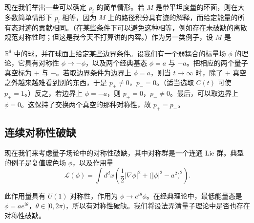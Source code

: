 
现在我们举出一些可以确定 $p_i$ 的简单情形。若 $M$ 是带平坦度量的环面，则在大多数简单情形下 $p_i$ 相等，因为 $M$ 上的路径积分具有迹的解释，而给定能量的所有态对迹的贡献相同。（在某些条件下可以避免这种相等，例如存在未破缺的离散规范对称性时；但这是我今天不打算讲的内容。）作为另一类例子，设 $M$ 是

$\mathbb{R}^d$ 中的球，并在球面上给定某些边界条件。设我们有一个弱耦合的标量场 $\phi$ 的理论，它具有对称性 $\phi\to-\phi$，以及两个经典基态 $\phi=a$ 与 $-a$。把相应的两个量子真空标为 $+$ 与 $-$。若取边界条件为边界上 $\phi=a$，则当 $t\to\infty$ 时，除了 $+$ 真空之外越来越难看到别的东西，于是 $p_+\neq0$，$p_-=0$。（适当选取 $C(t)$ 可使 $p_+=1$。）反之，若边界上 $\phi=-a$，则 $p_+=0$，$p_-\neq0$。最后，可以取边界上 $\phi=0$。这保持了交换两个真空的那种对称性，故 $p_+=p_-$。

\subsection{连续对称性破缺}

现在我们来考虑量子场论中的对称性破缺，其中对称群是一个连通 Lie 群。典型的例子是复值玻色场 $\phi$，以及作用量
\begin{equation}
  \tag{1.13}
  \label{eq:1-13}
  \mathcal{L}(\phi)=\int d^dx\left(\frac12|\nabla\phi|^2+\bigl(|\phi|^2-a^2\bigr)^2\right).
\end{equation}


此作用量具有 $U(1)$ 对称性，作用为 $\phi\to e^{i\theta}\phi$。在经典理论中，最低能量态是 $\phi=ae^{i\theta}$，$\theta\in[0,2\pi)$，所以有对称性破缺。我们将设法弄清量子理论中是否也存在对称性破缺。


